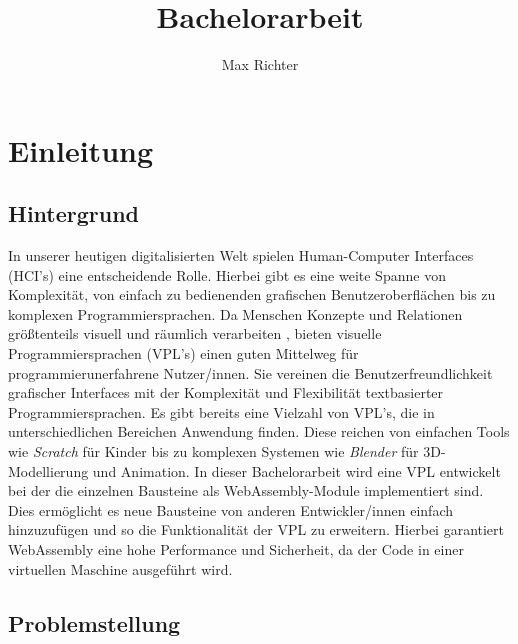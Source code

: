 \documentclass[ngerman]{article}
\title{Bachelorarbeit}
\author{Max Richter}
\begin{document}
\pagestyle{fancy}
\fancyhead{} %
\fancyfoot{} %
\fancyfoot[LE,RO]{\thepage}

\raggedright

\maketitle
\pagebreak

\tableofcontents

\pagebreak

\section{Einleitung}

\subsection{Hintergrund}
In unserer heutigen digitalisierten Welt spielen Human-Computer Interfaces (HCI's) eine entscheidende Rolle.
Hierbei gibt es eine weite Spanne von Komplexität, von einfach zu bedienenden grafischen Benutzeroberflächen bis zu komplexen Programmiersprachen. 
\br
Da Menschen Konzepte und Relationen größtenteils visuell und räumlich verarbeiten \cite{smith1974pygmalion}, bieten visuelle Programmiersprachen (VPL's) einen guten Mittelweg für programmierunerfahrene Nutzer/innen. 
Sie vereinen die Benutzerfreundlichkeit grafischer Interfaces mit der Komplexität und Flexibilität textbasierter Programmiersprachen.
\br
Es gibt bereits eine Vielzahl von VPL's, die in unterschiedlichen Bereichen Anwendung finden. 
Diese reichen von einfachen Tools wie \textit{Scratch} für Kinder bis zu komplexen Systemen wie \textit{Blender} für 3D-Modellierung und Animation.
\br
In dieser Bachelorarbeit wird eine VPL entwickelt bei der die einzelnen Bausteine als WebAssembly-Module implementiert sind. 
Dies ermöglicht es neue Bausteine von anderen Entwickler/innen einfach hinzuzufügen und so die Funktionalität der VPL zu erweitern.
Hierbei garantiert WebAssembly eine hohe Performance und Sicherheit, da der Code in einer virtuellen Maschine ausgeführt wird.

\subsection{Problemstellung}
\end{document}
